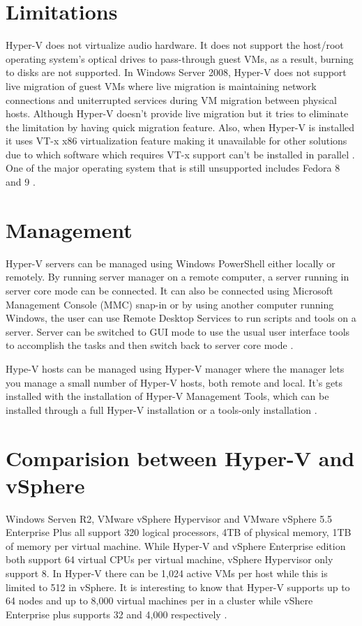 \documentclass[9pt,twocolumn,twoside]{../../styles/osajnl}
\begin{document}
\section{Limitations}

Hyper-V does not virtualize audio hardware. It does not support the
host/root operating system's optical drives to pass-through guest VMs,
as a result, burning to disks are not supported. In Windows Server
2008, Hyper-V does not support live migration of guest VMs where live
migration is maintaining network connections and uniterrupted \SE services
during VM migration between physical hosts. Although Hyper-V doesn't
provide live migration but it tries to eliminate the limitation by
having quick migration feature. Also, when Hyper-V is installed it
uses VT-x x86 virtualization feature making it unavailable for other
solutions due to which software which requires VT-x support can't be
installed in parallel \cite{www-hyperv-wikipedia}. One of the major
operating system that is still unsupported includes Fedora 8 and 9 \CE.

\section{Management}

Hyper-V servers can be managed using Windows PowerShell \CE either locally
or remotely. By running server manager on a remote computer, a server
running in server core mode can be connected. It can also be connected
using Microsoft Management Console (MMC) \CE snap-in or by using another
computer running Windows, the user can use Remote Desktop Services to
run scripts and tools on a server. Server can be switched to GUI \TE
{} mode
to use the usual user interface tools to accomplish the tasks and then
switch back to server core mode \cite{www-microsoft-technet}.

Hype-V hosts can be managed using Hyper-V manager where the manager
lets you manage a small number of Hyper-V hosts, both remote and
local. It's gets installed with the installation of Hyper-V Management
Tools, which can be installed through a full Hyper-V installation or a
tools-only installation \cite{www-microsoft-technet}.

\section{Comparision between Hyper-V and vSphere}
\SE
Windows Serven  R2, VMware vSphere Hypervisor and VMware vSphere
5.5 Enterprise Plus all support 320 logical processors, 4TB of
physical memory, 1TB of memory per virtual machine. While Hyper-V and
vSphere Enterprise edition both support 64 virtual CPUs per virtual
machine, vSphere Hypervisor only support 8. In Hyper-V there can be
1,024 active VMs per host while this is limited to 512 in vSphere. It
is interesting to know that Hyper-V supports up to 64 nodes and up to
8,000 virtual machines per in a cluster while vShere Enterprise plus
supports 32 and 4,000 respectively \cite{www-hyperv-paper}.
\end{document}
